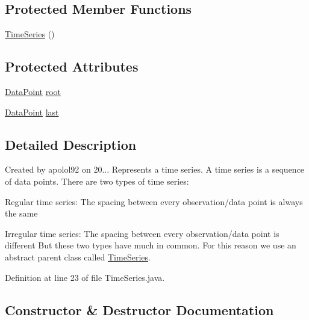 \subsection*{Protected Member Functions}
\begin{DoxyCompactItemize}
\item 
\hyperlink{classtimeseries_1_1_time_series_ace12d3eb25b3d267b90c7c08a4f4445d}{Time\+Series} ()
\end{DoxyCompactItemize}
\subsection*{Protected Attributes}
\begin{DoxyCompactItemize}
\item 
\hyperlink{classtimeseries_1_1_data_point}{Data\+Point} \hyperlink{classtimeseries_1_1_time_series_affc228300a6e7aeff7646df39da9269a}{root}
\item 
\hyperlink{classtimeseries_1_1_data_point}{Data\+Point} \hyperlink{classtimeseries_1_1_time_series_afeb87d5f2b84516c9cad5623a497a783}{last}
\end{DoxyCompactItemize}


\subsection{Detailed Description}
Created by apolol92 on 20... Represents a time series. A time series is a sequence of data points. There are two types of time series\+:
\begin{DoxyItemize}
\item Regular time series\+: The spacing between every observation/data point is always the same
\item Irregular time series\+: The spacing between every observation/data point is different But these two types have much in common. For this reason we use an abstract parent class called \hyperlink{classtimeseries_1_1_time_series}{Time\+Series}. 
\end{DoxyItemize}

Definition at line 23 of file Time\+Series.\+java.



\subsection{Constructor \& Destructor Documentation}
\hypertarget{classtimeseries_1_1_time_series_ace12d3eb25b3d267b90c7c08a4f4445d}{}
